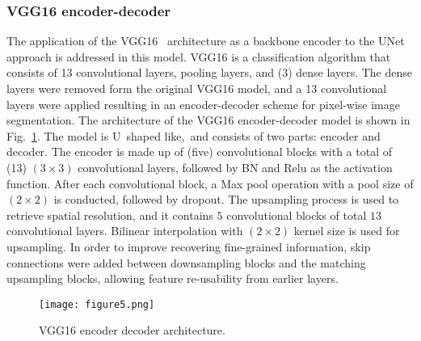 \subsubsection{VGG16 encoder-decoder}
The application of the VGG16~\cite{Simonyan2015} architecture as a backbone encoder to the UNet~\cite{Ronneberger2015} approach is addressed in this model.
VGG16 is a classification algorithm that consists of 13 convolutional layers, pooling layers, and (3) dense layers.
The dense layers were removed form the original VGG16 model, and a 13 convolutional layers were applied resulting in an encoder-decoder scheme for pixel-wise image segmentation.
The architecture of the VGG16 encoder-decoder model is shown in Fig.~\ref{vgg16}.
The model is U shaped like, and consists of two parts: encoder and decoder.
The encoder is made up of (five) convolutional blocks with a total of (13) \((3\times3)\) convolutional layers, followed by BN and Relu as the activation function.
After each convolutional block, a Max pool operation with a pool size of \((2\times2)\) is conducted, followed by dropout. 
The upsampling process is used to retrieve spatial resolution, and it contains \(5\) convolutional blocks of total \(13\) convolutional layers.
Bilinear interpolation with \((2\times2)\) kernel size is used for upsampling.
In order to improve recovering fine-grained information, skip connections were added between downsampling blocks and the matching upsampling blocks, allowing feature re-usability from earlier layers.
\begin{figure} [h!]
	\begin{center}
		\texttt{[image: figure5.png]}
	\end{center}
	\caption{VGG16 encoder decoder architecture.} 
	\label{vgg16}
\end{figure}

